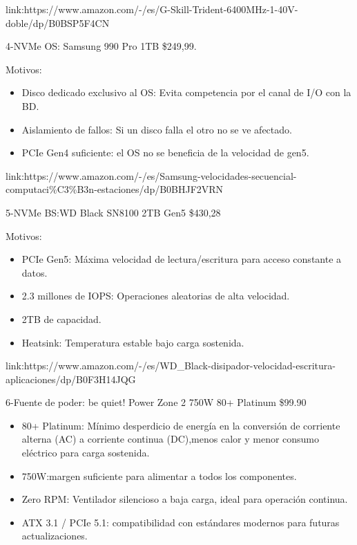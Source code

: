 \documentclass[14pt]{extarticle}
\begin{document}
link:https://www.amazon.com/-/es/G-Skill-Trident-6400MHz-1-40V-doble/dp/B0BSP5F4CN

4-NVMe OS: Samsung 990 Pro 1TB \$249,99.

Motivos:

\begin{itemize}
\item
  Disco dedicado exclusivo al OS: Evita competencia por el canal de I/O
  con la BD.
\item
  Aislamiento de fallos: Si un disco falla el otro no se ve afectado.
\item
  PCIe Gen4 suficiente: el OS no se beneficia de la velocidad de gen5.
\end{itemize}

link:https://www.amazon.com/-/es/Samsung-velocidades-secuencial-computaci\%C3\%B3n-estaciones/dp/B0BHJF2VRN

5-NVMe BS:WD Black SN8100 2TB Gen5 \$430,28

Motivos:

\begin{itemize}
\item
  PCIe Gen5: Máxima velocidad de lectura/escritura para acceso constante
  a datos.
\item
  2.3 millones de IOPS: Operaciones aleatorias de alta velocidad.
\item
  2TB de capacidad.
\item
  Heatsink: Temperatura estable bajo carga sostenida.
\end{itemize}

link:https://www.amazon.com/-/es/WD\_Black-disipador-velocidad-escritura-aplicaciones/dp/B0F3H14JQG

6-Fuente de poder: be quiet! Power Zone 2 750W 80+ Platinum \$99.90

\begin{itemize}
\item
  80+ Platinum: Mínimo desperdicio de energía en la conversión de
  corriente alterna (AC) a corriente continua (DC),menos calor y menor
  consumo eléctrico para carga sostenida.
\item
  750W:margen suficiente para alimentar a todos los componentes.
\item
  Zero RPM: Ventilador silencioso a baja carga, ideal para operación
  continua.
\item
  ATX 3.1 / PCIe 5.1: compatibilidad con estándares modernos para
  futuras actualizaciones.
\end{itemize}
\end{document}
